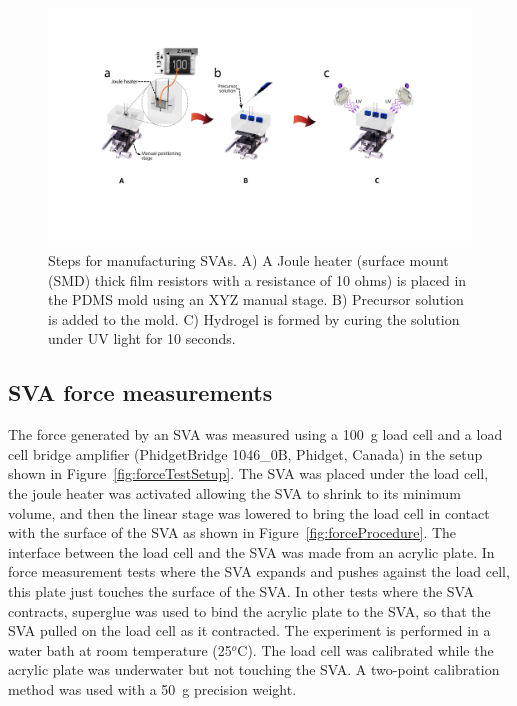 \begin{figure}[h]
      \centering
      \includegraphics[width=\textwidth]{svaManufacturing.pdf}
      \caption{Steps for manufacturing SVAs. A) A Joule heater (surface mount (SMD) thick film resistors with a resistance of 10 ohms) is placed in the PDMS mold using an XYZ manual stage. B) Precursor solution is added to the mold. C) Hydrogel is formed by curing the solution under UV light for 10 seconds.}
      \label{fig:Manufac}
\end{figure}

\subsection{SVA force measurements}
The force generated by an SVA was measured using a 100~g load cell and a load cell bridge amplifier (PhidgetBridge 1046_0B, Phidget, Canada) in the setup shown in Figure~\ref{fig:forceTestSetup}. The SVA was placed under the load cell, the joule heater was activated allowing the SVA to shrink to its minimum volume, and then the linear stage was lowered to bring the load cell in contact with the surface of the SVA as shown in Figure~\ref{fig:forceProcedure}. The interface between the load cell and the SVA was made from an acrylic plate. In force measurement tests where the SVA expands and pushes against the load cell, this plate just touches the surface of the SVA. In other tests where the SVA contracts, superglue was used to bind the acrylic plate to the SVA, so that the SVA pulled on the load cell as it contracted. The experiment is performed in a water bath at room temperature (25$^o$C). The load cell was calibrated while the acrylic plate was underwater but not touching the SVA. A two-point calibration method was used with a 50~g precision weight.

